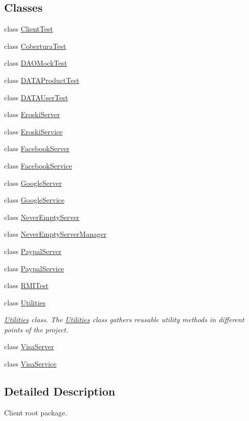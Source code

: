 \subsection*{Classes}
\begin{DoxyCompactItemize}
\item 
class \mbox{\hyperlink{class_s_p_q_1_1_client_test}{Client\+Test}}
\item 
class \mbox{\hyperlink{class_s_p_q_1_1_cobertura_test}{Cobertura\+Test}}
\item 
class \mbox{\hyperlink{class_s_p_q_1_1_d_a_o_mock_test}{D\+A\+O\+Mock\+Test}}
\item 
class \mbox{\hyperlink{class_s_p_q_1_1_d_a_t_a_product_test}{D\+A\+T\+A\+Product\+Test}}
\item 
class \mbox{\hyperlink{class_s_p_q_1_1_d_a_t_a_user_test}{D\+A\+T\+A\+User\+Test}}
\item 
class \mbox{\hyperlink{class_s_p_q_1_1_eroski_server}{Eroski\+Server}}
\item 
class \mbox{\hyperlink{class_s_p_q_1_1_eroski_service}{Eroski\+Service}}
\item 
class \mbox{\hyperlink{class_s_p_q_1_1_facebook_server}{Facebook\+Server}}
\item 
class \mbox{\hyperlink{class_s_p_q_1_1_facebook_service}{Facebook\+Service}}
\item 
class \mbox{\hyperlink{class_s_p_q_1_1_google_server}{Google\+Server}}
\item 
class \mbox{\hyperlink{class_s_p_q_1_1_google_service}{Google\+Service}}
\item 
class \mbox{\hyperlink{class_s_p_q_1_1_never_empty_server}{Never\+Empty\+Server}}
\item 
class \mbox{\hyperlink{class_s_p_q_1_1_never_empty_server_manager}{Never\+Empty\+Server\+Manager}}
\item 
class \mbox{\hyperlink{class_s_p_q_1_1_paypal_server}{Paypal\+Server}}
\item 
class \mbox{\hyperlink{class_s_p_q_1_1_paypal_service}{Paypal\+Service}}
\item 
class \mbox{\hyperlink{class_s_p_q_1_1_r_m_i_test}{R\+M\+I\+Test}}
\item 
class \mbox{\hyperlink{class_s_p_q_1_1_utilities}{Utilities}}
\begin{DoxyCompactList}\small\item\em \mbox{\hyperlink{class_s_p_q_1_1_utilities}{Utilities}} class. The \mbox{\hyperlink{class_s_p_q_1_1_utilities}{Utilities}} class gathers reusable utility methods in different points of the project. \end{DoxyCompactList}\item 
class \mbox{\hyperlink{class_s_p_q_1_1_visa_server}{Visa\+Server}}
\item 
class \mbox{\hyperlink{class_s_p_q_1_1_visa_service}{Visa\+Service}}
\end{DoxyCompactItemize}


\subsection{Detailed Description}
Client root package. 